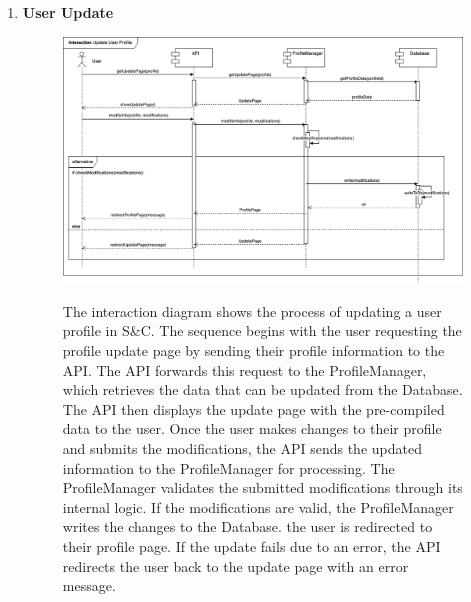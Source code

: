\begin{enumerate}
    \newpage
    \item \textbf{User Update}
    \begin{figure}[h!]
            \centering  \includegraphics[width=1\textwidth]{DD/Images/Interactions/INT03_UserUpdate.drawio.png}
            \label{fig:ComponentViewDiagram}
            \caption*{The interaction diagram shows the process of updating a user profile in S\&C. The sequence begins with the user requesting the profile update page by sending their profile information to the API. The API forwards this request to the ProfileManager, which retrieves the data that can be updated  from the Database. The API then displays the update page with the pre-compiled data to the user.
            Once the user makes changes to their profile and submits the modifications, the API sends the updated information to the ProfileManager for processing. The ProfileManager validates the submitted modifications through its internal logic. If the modifications are valid, the ProfileManager writes the changes to the Database.
            the user is redirected to their profile page. If the update fails due to an error, the API redirects the user back to the update page with an error message.}
    \end{figure}


\end{enumerate}
